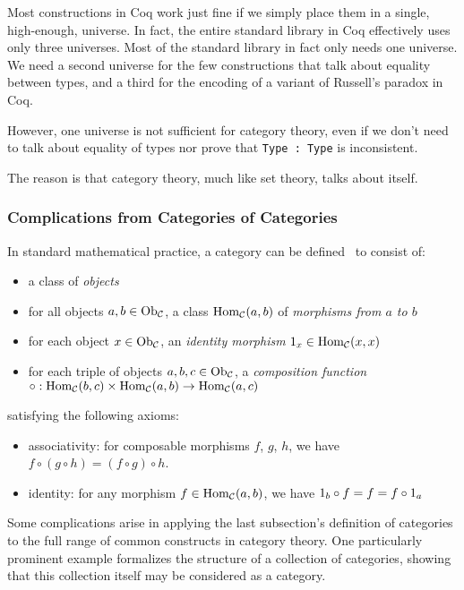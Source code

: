 Most constructions in Coq work just fine if we simply place them in a single, high-enough, universe.
In fact, the entire standard library in Coq effectively uses only three universes.
Most of the standard library in fact only needs one universe.
We need a second universe for the few constructions that talk about equality between types, and a third for the encoding of a variant of Russell's paradox in Coq.

However, one universe is not sufficient for category theory, even if we don't need to talk about equality of types nor prove that \texttt{Type : Type} is inconsistent.

The reason is that category theory, much like set theory, talks about itself.

\subsubsection{Complications from Categories of Categories}\label{sec:category-def}\label{sec:category-of-categories}

In standard mathematical practice, a category  can be defined~\cite{awodey2010category} to consist of:
\begin{itemize}
  \item
    a class \Ob[C] of \emph{objects}
  \item
    for all objects $a, b \in \Ob[C]$, a class $\Hom[C](a, b)$ of \emph{morphisms from $a$ to $b$}
  \item
    for each object $x \in \Ob[C]$, an \emph{identity morphism} $\Id[x] \in \Hom[C](x, x)$
  \item
    for each triple of objects $a, b, c \in \Ob[C]$, a \emph{composition function} $\circ : \Hom[C](b, c) \times \Hom[C](a, b) \to \Hom[C](a, c)$
\end{itemize}
satisfying the following axioms:
\begin{itemize}
  \item
    associativity: for composable morphisms $f$, $g$, $h$, we have $f \circ (g \circ h) = (f \circ g) \circ h$.
  \item
    identity: for any morphism $f \in \Hom[C](a, b)$, we have $\Id[b] \circ f = f = f \circ \Id[a]$
\end{itemize}

Some complications arise in applying the last subsection's definition of categories to the full range of common constructs in category theory.
One particularly prominent example formalizes the structure of a collection of categories, showing that this collection itself may be considered as a category.

